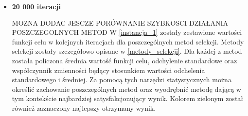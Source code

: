 \begin{itemize}
\item  \textbf{20 000 iteracji}\\
\par
 MOZNA DODAC JESCZE PORÓWNANIE SZYBKOSCI DZIAŁANIA POSZCZEGOLNYCH METOD
 W \ref{instancja_1} zostały zestawione wartości funkcji celu w kolejnych iteracjach dla poszczególnych metod selekcji. Metody selekcji zostały szczegółowo opisane w \ref{metody_selekcji}. Dla każdej z metod została policzona średnia wartość funkcji celu, odchylenie standardowe oraz współczynnik zmienności będący stosunkiem wartości odchelenia standardowego i średniej. Za pomocą tych narzędzi statystycznych można określić zachowanie poszczególnych metod oraz wyodrębnić metodę dającą w tym kontekście najbardziej satysfakcjonujący wynik. Kolorem zielonym został również zaznaczony najlepszy otrzymany wynik.\\
\par
\begin{table}[h!]
\begin{center}
\end{center}
\end{table}
\end{itemize}
